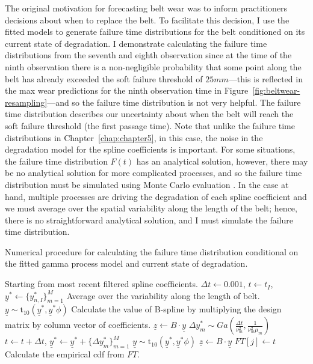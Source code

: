 The original motivation for forecasting belt wear was to inform practitioners decisions about when to replace the belt. To facilitate this decision, I use the fitted models to generate failure time distributions for the belt conditioned on its current state of degradation. I demonstrate calculating the failure time distributions from the seventh and eighth observation since at the time of the ninth observation there is a non-negligible probability that some point along the belt has already exceeded the soft failure threshold of $25mm$---this is reflected in the max wear predictions for the ninth observation time in Figure~\ref{fig:beltwear-resampling}---and so the failure time distribution is not very helpful. The failure time distribution describes our uncertainty about when the belt will reach the soft failure threshold (the first passage time). Note that unlike the failure time distributions in Chapter~\ref{chap:chapter5}, in this case, the noise in the degradation model for the spline coefficients is important. For some situations, the failure time distribution $F(t)$ has an analytical solution, however, there may be no analytical solution for more complicated processes, and so the failure time distribution must be simulated using Monte Carlo evaluation \citep[p.~504-506]{Meeker2022}. In the case at hand, multiple processes are driving the degradation of each spline coefficient and we must average over the spatial variability along the length of the belt; hence, there is no straightforward analytical solution, and I must simulate the failure time distribution.

\begin{algorithm}
	\caption{Numerical procedure for calculating the failure time distribution conditional on the fitted gamma process model and current state of degradation.}
  \label{algo:ftd}
	\begin{algorithmic}[2]
        \State Starting from most recent filtered spline coefficients.
        \State $\Delta t \gets 0.001$, $t \gets t_I$, $\underline{y}^* \gets \{y^*_{n, I}\}^M_{m = 1}$
        \State Average over the variability along the length of belt.
        \State $\underline{y} \sim \mbox{t}_{10}\left(\underline{y}^*, \underline{y}^* \phi\right)$
        \State Calculate the value of B-spline by multiplying the design matrix by column vector of coefficients.
        \State $\underline{z} \gets B \cdot \underline{y}$
          \State $\Delta y^*_m \sim Ga\left(\frac{\Delta t}{\nu_m^2}, \frac{1}{\nu_m^2 \mu_m}\right)$
          \State $t \gets t + \Delta t$, $\underline{y}^* \gets \underline{y}^* + \{\Delta y^*_m\}^M_{m = 1}$
          \State $\underline{y} \sim \mbox{t}_{10}\left(\underline{y}^*, \underline{y}^* \phi\right)$
          \State $\underline{z} \gets B \cdot \underline{y}$
        \EndWhile
        \State $FT[j] \gets t$
      \EndFor
      \State Calculate the empirical cdf from $FT$.
    \EndFor
	\end{algorithmic} 
\end{algorithm} 

